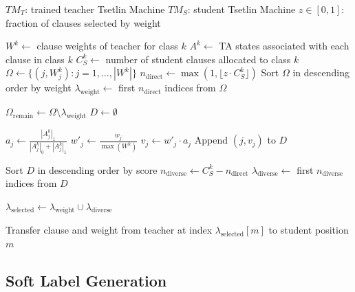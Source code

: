 \documentclass[sn-mathphys-num]{sn-jnl}%
\theoremstyle{thmstyleone}%
\theoremstyle{thmstyletwo}%
\theoremstyle{thmstylethree}%
\providecommand{\DIFaddbegin}{} %
\providecommand{\DIFaddend}{} %
\providecommand{\DIFdelbegin}{} %
\providecommand{\DIFdelend}{} %
\providecommand{\DIFscaledelfig}{0.5}
\newlength{\DIFdelgraphicswidth} %
\newlength{\DIFdelgraphicsheight} %
\providecommand{\DIFaddincludegraphics}[2][]{{\color{blue}\fbox{\DIFOincludegraphics[#1]{#2}}}} %
\providecommand{\DIFdelincludegraphics}[2][]{%
\sbox{\DIFdelgraphicsbox}{\DIFOincludegraphics[#1]{#2}}%
\settoboxwidth{\DIFdelgraphicswidth}{\DIFdelgraphicsbox} %
\settoboxtotalheight{\DIFdelgraphicsheight}{\DIFdelgraphicsbox} %
\scalebox{\DIFscaledelfig}{%
\parbox[b]{\DIFdelgraphicswidth}{\usebox{\DIFdelgraphicsbox}\\[-\baselineskip] \rule{\DIFdelgraphicswidth}{0em}}\llap{\resizebox{\DIFdelgraphicswidth}{\DIFdelgraphicsheight}{%
\setlength{\unitlength}{\DIFdelgraphicswidth}%
\begin{picture}(1,1)%
\thicklines\linethickness{2pt} %
{\color[rgb]{1,0,0}\put(0,0){\framebox(1,1){}}}%
{\color[rgb]{1,0,0}\put(0,0){\line( 1,1){1}}}%
{\color[rgb]{1,0,0}\put(0,1){\line(1,-1){1}}}%
\end{picture}%
}\hspace*{3pt}}} %
} %
\DeclareRobustCommand{\DIFaddbegin}{\DIFOaddbegin \let\includegraphics\DIFaddincludegraphics} %
\DeclareRobustCommand{\DIFaddend}{\DIFOaddend \let\includegraphics\DIFOincludegraphics} %
\DeclareRobustCommand{\DIFdelbegin}{\DIFOdelbegin \let\includegraphics\DIFdelincludegraphics} %
\DeclareRobustCommand{\DIFdelend}{\DIFOaddend \let\includegraphics\DIFOincludegraphics} %
\begin{document}
\DIFdelbegin %
\DIFdelend \DIFaddbegin \begin{algorithm}[h]
\DIFaddend \caption{IntelligentTransfer: Clause Initialization for Student Tsetlin Machine}
\label{algo:init-clauses}
\begin{algorithmic}[1]
\Require $TM_T$: trained teacher Tsetlin Machine
\Require $TM_S$: student Tsetlin Machine
\Require $z \in [0,1]$: fraction of clauses selected by weight

    \State $W^k \gets$ clause weights of teacher for class $k$
    \State $A^k \gets$ TA states associated with each clause in class $k$
    \State $C_S^k \gets$ number of student clauses allocated to class $k$
    \State $\Omega \gets \{(j, W^k_j) : j = 1,\ldots,|W^k|\}$
    \State $n_{\text{direct}} \gets \max(1,\lfloor z \cdot C_S^k \rfloor)$
    \State Sort $\Omega$ in descending order by weight
    \State $\lambda_{\text{weight}} \gets$ first $n_{\text{direct}}$ indices from $\Omega$

    \State $\Omega_{\text{remain}} \gets \Omega \setminus \lambda_{\text{weight}}$
    \State $D \gets \emptyset$

        \State $a_j \gets \frac{|A_j^k|_1}{|A_j^k|_0 + |A_j^k|_1}$
        \State $w'_j \gets \frac{w_j}{\max(W^k)}$
        \State $v_j \gets w'_j \cdot a_j$
        \State Append $(j, v_j)$ to $D$
    \EndFor

    \State Sort $D$ in descending order by score
    \State $n_{\text{diverse}} \gets C_S^k - n_{\text{direct}}$
    \State $\lambda_{\text{diverse}} \gets$ first $n_{\text{diverse}}$ indices from $D$

    \State $\lambda_{\text{selected}} \gets \lambda_{\text{weight}} \cup \lambda_{\text{diverse}}$

        \State Transfer clause and weight from teacher at index $\lambda_{\text{selected}}[m]$ to student position $m$
    \EndFor
\EndFor

\EndFunction
\end{algorithmic}
\end{algorithm}

\subsection{Soft Label Generation}
\end{document}
